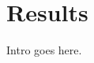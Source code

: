 \documentclass[Thesis.tex]{subfiles}
\begin{document}
\chapter{Results}
\label{chp:results}

Intro goes here.
\end{document}
